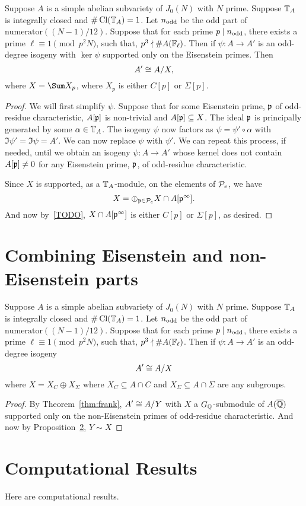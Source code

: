 \documentclass[thesis.tex]{subfiles}
\begin{document}
\begin{corollary}
    Suppose $A$ is a simple abelian subvariety of $J_0(N)$ with $N$ prime.
    Suppose $\TT_A$ is integrally closed and $\#\Cl(\TT_A)=1$. Let $n_\odd$ be
    the odd part of $\mathrm{numerator}((N-1)/12)$. Suppose that for each prime
    $p\mid n_\odd$, there exists a prime $\ell\equiv 1 \pmod{p^2N}$, such that,
    $p^3\nmid \#A(\F_\ell)$. Then if $\psi:A\to A'$ is an odd-degree isogeny
    with $\ker\psi$ supported only on the Eisenstein primes. Then
    \[
        A'\isom A/X,
    \]
    where $X=\Sum X_p$, where $X_p$ is either $C[p]$ or $\Sigma[p]$.
\end{corollary}
\begin{proof}
    We will first simplify $\psi$. Suppose that for some Eisenstein prime, $\p$
    of odd-residue characteristic, $A[\p]$ is non-trivial and $A[\p]\subseteq
    X$. The ideal $\p$ is principally generated by some $\alpha\in \TT_A$. The
    isogeny $\psi$ now factors as $\psi=\psi'\circ \alpha$ with $\Im \psi'=\Im
    \psi = A'$. We can now replace $\psi$ with $\psi'$. We can repeat this
    process, if needed, until we obtain an isogeny $\psi:A\to A'$ whose kernel
    does not contain $A[\p]\neq 0$ for any Eisenstein prime, $\p$, of odd-residue
    characteristic.

    Since $X$ is supported, as a $\TT_A$-module, on the elements of $\P_e$, we
    have
    \[
        X = \oplus_{\p\in \P_e} X\cap A[\p^\infty].
    \]
    And now by~\ref{TODO}, $X\cap A[\p^\infty]$ is either $C[p]$ or
    $\Sigma[p]$, as desired.
\end{proof}


\section{Combining Eisenstein and non-Eisenstein parts}%
\label{sec:combining_eisenstein_and_non_eisenstein_parts}

\begin{theorem}
    Suppose $A$ is a simple abelian subvariety of $J_0(N)$ with $N$ prime.
    Suppose $\TT_A$ is integrally closed and $\#\Cl(\TT_A)=1$. Let $n_\odd$ be
    the odd part of $\mathrm{numerator}((N-1)/12)$. Suppose that for each prime
    $p\mid n_\odd$, there exists a prime $\ell\equiv 1 \pmod{p^2N}$, such that,
    $p^3\nmid \#A(\F_\ell)$. Then if $\psi:A\to A'$ is an odd-degree isogeny
    \[
        A'\isom A/X
    \]
    where $X=X_C\oplus X_\Sigma$ where $X_C\subseteq A\cap C$ and $X_\Sigma
    \subseteq A\cap \Sigma$ are any subgroups.
\end{theorem}
\begin{proof}
    By Theorem~\ref{thm:frank}, $A'\isom A/Y$ with $X$ a $G_\QQ$-submodule of
    $A(\QQbar)$ supported only on the non-Eisenstein primes of odd-residue
    characteristic. And now by Proposition~\ref{}, $Y\sim X$
\end{proof}

\section{Computational Results}

Here are computational results.
\end{document}
